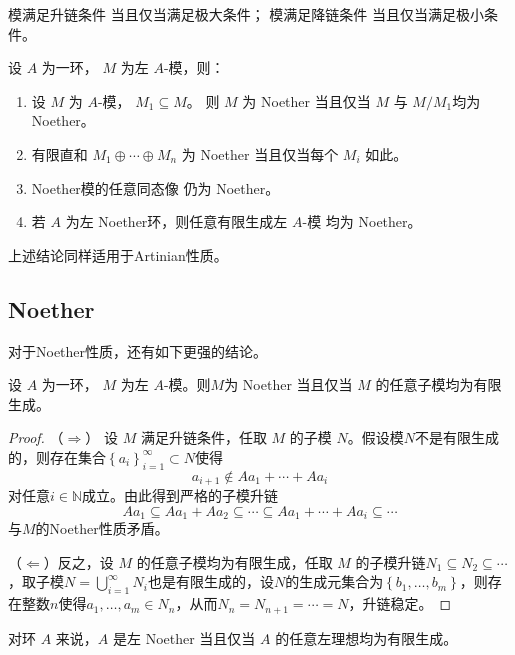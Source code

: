 \documentclass[12pt,a4paper]{ctexrep}   %
\begin{document}
\begin{theorem}\label{thm:chain-max}
    模满足升链条件
    当且仅当满足极大条件；
    模满足降链条件
    当且仅当满足极小条件。
\end{theorem}

\begin{corollary}[链条件的稳定性]\label{cor:chain-stability}
    设 $A$ 为一环， $M$ 为左 $A$-模，则：
    \begin{enumerate}
        \item
              设 $M$ 为 $A$-模，
              $M_1\subseteq M$。
              则
              $M$ 为 Noether
              当且仅当
              $M$  与  $M/M_1 $均为 Noether。


        \item
              有限直和  $M_1\oplus\cdots\oplus M_n$
              为 Noether   当且仅当每个 $M_i$ 如此。

        \item
              Noether模的任意同态像
              仍为 Noether。

        \item
              若 $A$ 为左 Noether环，则任意有限生成左 $A$-模
              均为 Noether。
    \end{enumerate}
\end{corollary}
\begin{remark}
    上述结论同样适用于Artinian性质。
\end{remark}
\subsection{Noether}
对于Noether性质，还有如下更强的结论。
\begin{theorem}
    \label{thm:Noether}
    设 $A$ 为一环， $M$ 为左 $A$-模。则$M$为 Noether 当且仅当 $M$ 的任意子模均为有限生成。
    \begin{proof}
        （$\Rightarrow$）
        设 $M$ 满足升链条件，任取 $M$ 的子模 $N$。假设模$N$不是有限生成的，则存在集合$\left\{a_i\right\}_{i=1}^\infty\subset N$使得 $$a_{i+1}\notin Aa_1+\cdots+Aa_i$$对任意$i\in \mathbb{N}$成立。由此得到严格的子模升链
        \begin{equation*}
            Aa_1\subseteq Aa_1+Aa_2\subseteq \cdots \subseteq Aa_1+\cdots+Aa_i\subseteq \cdots
        \end{equation*}
        与$M$的Noether性质矛盾。

        （$\Leftarrow$）反之，设 $M$ 的任意子模均为有限生成，任取 $M$ 的子模升链$N_1\subseteq N_2\subseteq \cdots$，取子模$N = \bigcup_{i=1}^\infty N_i$也是有限生成的，设$N$的生成元集合为$\left\{b_1,\ldots,b_m\right\}$，则存在整数$n$使得$a_1,\ldots,a_m\in N_n$，从而$N_n=N_{n+1}=\cdots=N$，升链稳定。
    \end{proof}
\end{theorem}
\begin{remark}
    对环 $A$ 来说，$A$ 是左 Noether 当且仅当 $A$ 的任意左理想均为有限生成。
\end{remark}
\end{document}
